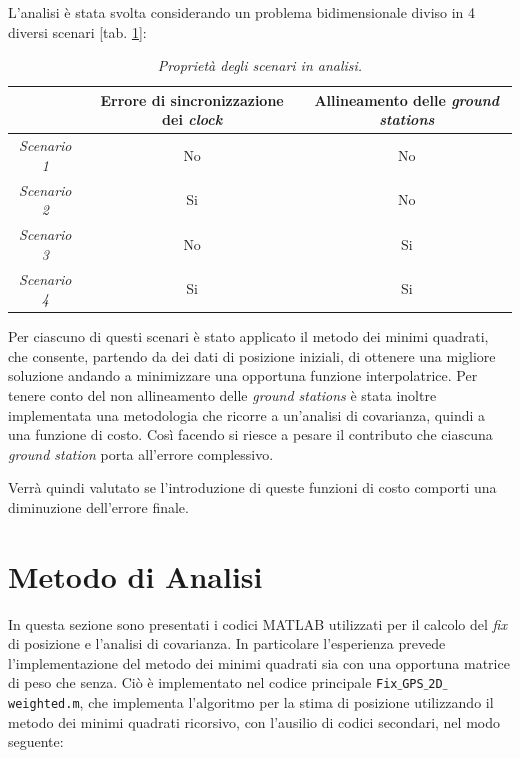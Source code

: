\documentclass[a4paper,11pt,twoside]{book}
\begin{document}
	L'analisi è stata svolta considerando un problema bidimensionale diviso in 4 diversi scenari [tab. \ref{tab0}]:

	\begin{table}[H]
		\begin{center}
			\begin{tabular}{|c|c|c|}
				\hline
				& Errore di sincronizzazione dei \textit{clock} & Allineamento delle \textit{ground stations} \\
				\hline
				\textsl{Scenario 1} & No & No \\
				\hline
				\textsl{Scenario 2} & Si & No \\
				\hline
				\textsl{Scenario 3} & No & Si \\
				\hline
				\textsl{Scenario 4} & Si & Si \\
				\hline
			\end{tabular}
		    \caption{\textit{Proprietà degli scenari in analisi.}}
			\label{tab0}
		\end{center}
	\end{table}

	
	Per ciascuno di questi scenari è stato applicato il metodo dei minimi quadrati, che consente, partendo da dei dati di posizione iniziali, di ottenere una migliore soluzione andando a minimizzare una opportuna funzione interpolatrice.
	Per tenere conto del non allineamento delle \textit{ground stations} è stata inoltre implementata una metodologia che ricorre a un’analisi di covarianza, quindi a una funzione di costo.
	Così facendo si riesce a pesare il contributo che ciascuna \textit{ground station} porta all’errore complessivo.
	
	Verrà quindi valutato se l’introduzione di queste funzioni di costo comporti una diminuzione dell’errore finale.
	
	
	\section{Metodo di Analisi}
	
	In questa sezione sono presentati i codici MATLAB utilizzati per il calcolo del \textit{fix} di posizione e l'analisi di covarianza. In particolare l'esperienza prevede l'implementazione del metodo dei minimi quadrati sia con una opportuna matrice di peso che senza. Ciò è implementato nel codice principale \texttt{Fix$\_$GPS$\_$2D$\_$weighted.m}, che implementa l'algoritmo per la stima di posizione utilizzando il metodo dei minimi quadrati ricorsivo, con l'ausilio di codici secondari, nel modo seguente:
	
\end{document}
